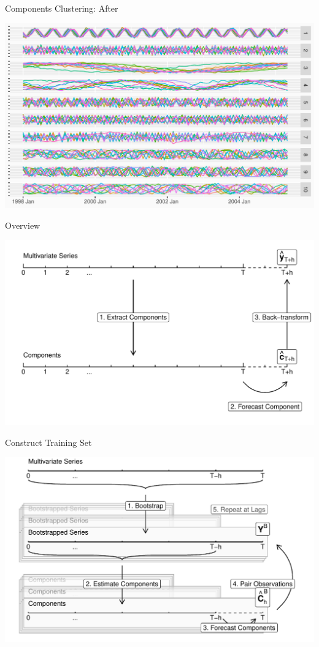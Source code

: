 \documentclass[14pt,ignorenonframetext,]{beamer}
\begin{document}
\begin{frame}{Components Clustering: After}
\protect\hypertarget{components-clustering-after}{}
\begin{center}
\includegraphics[width=\linewidth]{plot/p_cluster_after}
\end{center}
\end{frame}

\begin{frame}{Overview}
\protect\hypertarget{overview-2}{}
\centerline{
\includegraphics[width=\linewidth]{plot/p_timeline_notation}
}
\end{frame}

\begin{frame}{Construct Training Set}
\protect\hypertarget{construct-training-set-1}{}
\begin{center}
\includegraphics[width=\linewidth]{plot/p_backtransform_notation}
\end{center}
\end{frame}
\end{document}
